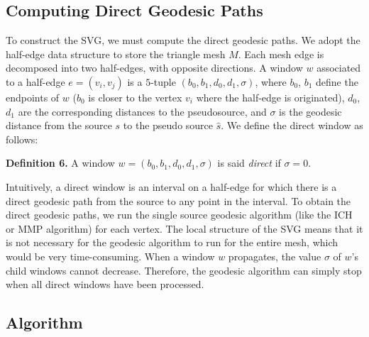 \subsection{Computing Direct Geodesic Paths}
\pichskip{5pt}%
To construct the SVG, we must compute the direct
geodesic paths. We adopt the half-edge data structure to store the
triangle mesh $M$. Each mesh edge is decomposed into two half-edges,
with opposite directions. A window $w$ associated to a half-edge
$e=(v_i,v_j)$ is a $5$-tuple $(b_0,b_1,d_0,d_1,\sigma)$, where
$b_0$, $b_1$ define the endpoints of $w$ ($b_0$ is closer to the
vertex $v_i$ where the half-edge is originated), $d_0$, $d_1$ are
the corresponding distances to the pseudosource, and $\sigma$ is the
geodesic distance from the source $s$ to the pseudo source
$\hat{s}$. We define the direct window as follows:

\noindent\textbf{Definition 6.} A window
$w=(b_0,b_1,d_0,d_1,\sigma)$ is said \textit{direct} if $\sigma=0$.

Intuitively, a direct window is an interval on a half-edge for which
there is a direct geodesic path from the source to any point in the
interval. To obtain the direct geodesic paths, we run the single
source geodesic algorithm (like the ICH or MMP algorithm) for each
vertex. The local structure of the SVG means that it is not
necessary for the geodesic algorithm to run for the entire mesh,
which would be very time-consuming. When a window $w$ propagates,
the value $\sigma$ of $w$'s child windows cannot decrease.
Therefore, the geodesic algorithm can simply stop when all direct
windows have been processed.

\subsection{Algorithm}

